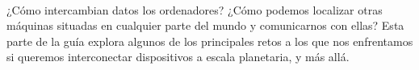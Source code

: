 \ \\[-10cm]
¿Cómo intercambian datos los ordenadores? ¿Cómo podemos localizar otras máquinas situadas en cualquier parte del mundo y comunicarnos con ellas?
Esta parte de la guía explora algunos de los principales retos a los que nos enfrentamos si queremos interconectar dispositivos a escala planetaria, y más allá.

